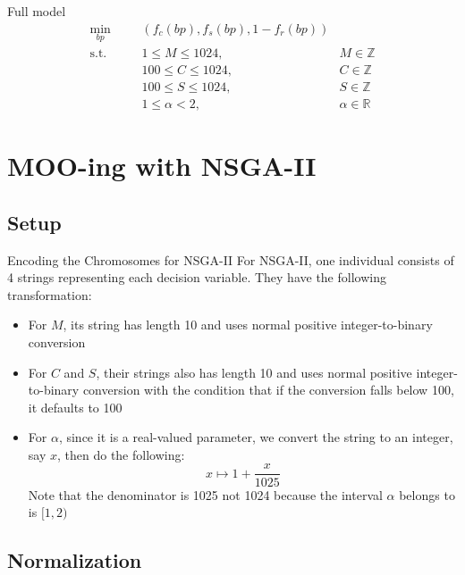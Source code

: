 \documentclass{beamer}
\begin{document}
\begin{frame}{Full model}
    \[
    \begin{aligned}
        \min_{bp} &\left(f_c(bp), f_s(bp), 1 - f_r(bp)\right) \\
        \text{s.t.} \qquad
            &1 \leq M \leq 1024, & M \in \mathbb{Z} \\
            &100 \leq C \leq 1024, & C \in \mathbb{Z} \\
            &100 \leq S \leq 1024, & S \in \mathbb{Z} \\
            &1 \leq \alpha < 2, &\alpha \in \mathbb{R}
    \end{aligned}
    \]
\end{frame}

\section{MOO-ing with NSGA-II}

\subsection{Setup}

\begin{frame}{Encoding the Chromosomes for NSGA-II}
    For NSGA-II, one individual consists of 4 strings representing each decision variable. They have the following transformation:
    \begin{itemize}
        \item For \(M\), its string has length 10 and uses normal positive integer-to-binary conversion
        \item For \(C\) and \(S\), their strings also has length 10 and uses normal positive integer-to-binary conversion with the condition that if the conversion falls below 100, it defaults to 100
        \item For \(\alpha\), since it is a real-valued parameter, we convert the string to an integer, say \(x\), then do the following:
            \[
                x \mapsto 1 + \frac{x}{1025}
            \]
            Note that the denominator is 1025 not 1024 because the interval \(\alpha\) belongs to is \([1, 2)\)
    \end{itemize}
\end{frame}

\subsection{Normalization}
\end{document}
